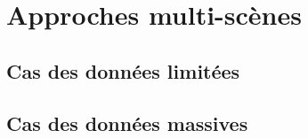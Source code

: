 \chapter{Approches multi-scènes}

\section{Cas des données limitées}

\section{Cas des données massives}
